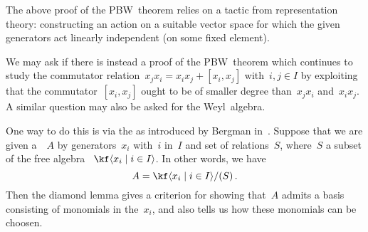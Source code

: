 \begin{remark}
  The above proof of the PBW~theorem relies on a tactic from representation theory:
  constructing an action on a suitable vector space for which the given generators act linearly independent (on some fixed element).

  We may ask if there is instead a proof of the PBW~theorem which continues to study the commutator relation~$x_j x_i = x_i x_j + [x_i, x_j]$ with~$i, j \in I$ by exploiting that the commutator~$[x_i, x_j]$ ought to be of smaller degree than~$x_j x_i$ and~$x_i x_j$.
  A similar question may also be asked for the Weyl~algebra.
  
  One way to do this is via the  as introduced by Bergman in~\cite{diamond_lemma}.
  Suppose that we are given a~\algebra{$\kf$}~$A$ by generators~$x_i$ with~$i$ in~$I$ and set of relations~$S$, where~$S$ a subset of the free algebra ~$\kf\gen{x_i \suchthat i \in I}$.
  In other words, we have
  \[
    A
    =
    \kf\gen{x_i \suchthat i \in I}
    /
    \ideal{ S } \,.
  \]
  Then the diamond lemma gives a criterion for showing that~$A$ admits a basis consisting of monomials in the~$x_i$, and also tells us how these monomials can be choosen.
  

\end{remark}
